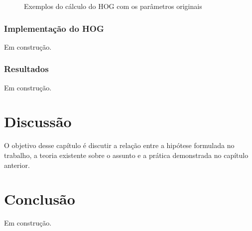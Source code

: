\begin{figure}[ht!]
\centering
{}
  \caption{Exemplos do cálculo do HOG com os parâmetros originais}
  \label{fig:hog_example1}
\end{figure}

\subsection{Implementação do HOG}

Em construção.

\subsection{Resultados}

Em construção.

\chapter{Discussão}

O objetivo desse capítulo é discutir a relação entre a hipótese formulada no trabalho, a teoria existente sobre o assunto e a prática demonstrada no capítulo anterior.

\chapter{Conclusão}

Em construção.